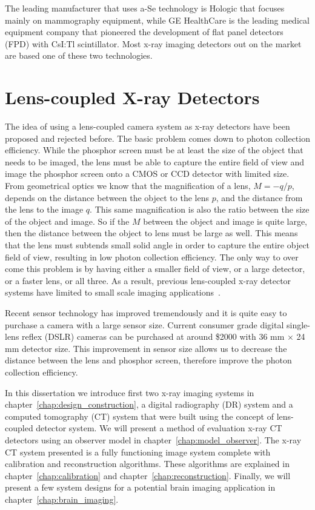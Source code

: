 The leading manufacturer that uses a-Se technology is Hologic that focuses mainly on mammography equipment, while GE HealthCare is the leading medical equipment company that pioneered the development of flat panel detectors (FPD) with CsI:Tl scintillator.  Most x-ray imaging detectors out on the market are based one of these two technologies.  

\section{Lens-coupled X-ray Detectors}
The idea of using a lens-coupled camera system as x-ray detectors have been proposed and rejected before.  The basic problem comes down to photon collection efficiency.  While the phosphor screen must be at least the size of the object that needs to be imaged, the lens must be able to capture the entire field of view and image the phosphor screen onto a CMOS or CCD detector with limited size.  From geometrical optics we know that the magnification of a lens, $M = -q/p$, depends on the distance between the object to the lens $p$, and the distance from the lens to the image $q$. This same magnification is also the ratio between the size of the object and image.  So if the $M$ between the object and image is quite large, then the distance between the object to lens must be large as well.  This means that the lens must subtends small solid angle in order to capture the entire object field of view, resulting in low photon collection efficiency.  The only way to over come this problem is by having either a smaller field of view, or a large detector, or a faster lens, or all three.  As a result, previous lens-coupled x-ray detector systems have limited to small scale imaging applications~\citep{lee2001, kim2005, tate2005, madden2006}.  

Recent sensor technology has improved tremendously and it is quite easy to purchase a camera with a large sensor size.  Current consumer grade digital single-lens reflex (DSLR) cameras can be purchased at around \$2000 with 36 mm $\times$ 24 mm detector size.  This improvement in sensor size allows us to decrease the distance between the lens and phosphor screen, therefore improve the photon collection efficiency.

In this dissertation we introduce first two x-ray imaging systems in chapter~\ref{chap:design_construction}, a digital radiography (DR) system and a computed tomography (CT) system that were built using the concept of lens-coupled detector system.  We will present a method of evaluation x-ray CT detectors using an observer model in chapter~\ref{chap:model_observer}.   The x-ray CT system presented is a fully functioning image system complete with calibration and reconstruction algorithms.  These algorithms are explained in chapter~\ref{chap:calibration} and chapter~\ref{chap:reconstruction}.  Finally, we will present a few system designs for a potential brain imaging application in chapter~\ref{chap:brain_imaging}.  
